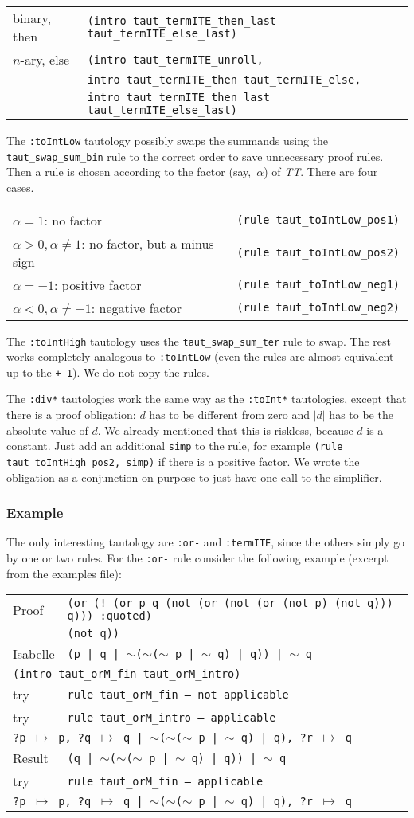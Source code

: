 \documentclass[10pt,a4paper]{article}
\newcommand{\ttt}{\texttt}
\newcommand{\negat}{\ensuremath{\sim}}
\newcommand{\nega}{\negat\xspace}
\newcommand{\pat}[2]{\ttt{?#1} $\mapsto$ \ttt{#2}}
\newcommand{\TTx}{\emph{TT}}
\newcommand{\TT}{\TTx\xspace}
\newenvironment{rt}{\begin{center}\begin{tabular}{|l l|}\hline}{\end{tabular}\end{center}}
\newcommand{\rl}[2]{\rm{#1} & \tt{#2} \\[1mm]}
\newcommand{\rll}[2]{\rm{#1} & \tt{#2} \\\hline}
\def\ind{\quad}
\newcommand{\exl}[2]{\exlm{#1}{\ttt{#2}}}
\newcommand{\exlm}[2]{#1 & #2 \\[1mm]}
\newcommand{\exmc}[2]{\multicolumn{2}{l}{\ttt{#1} #2} \\[1mm]}
\newcommand{\exmcf}[1]{\multicolumn{2}{l}{\ttt{#1}}}
\begin{document}
\begin{rt}
	\rl{binary, then}{(intro taut\_termITE\_then\_last taut\_termITE\_else\_last)}
	\rl{$n$-ary, else}{(intro taut\_termITE\_unroll,}
		\rl{}{\ind intro taut\_termITE\_then taut\_termITE\_else,}
		\rll{}{\ind intro taut\_termITE\_then\_last taut\_termITE\_else\_last)}
\end{rt}

\smallskip

The \ttt{:toIntLow} tautology possibly swaps the summands using the \ttt{taut\_swap\_sum\_bin} rule to the correct order to save unnecessary proof rules. Then a rule is chosen according to the factor (say,~$\alpha$) of \TT. There are four cases.
%
\begin{rt}
	\rl{$\alpha = 1$: no factor}{(rule taut\_toIntLow\_pos1)}
	\rl{$\alpha > 0, \alpha \neq 1$: no factor, but a minus sign}{(rule taut\_toIntLow\_pos2)}
	\rl{$\alpha = -1$: positive factor}{(rule taut\_toIntLow\_neg1)}
	\rll{$\alpha < 0, \alpha \neq -1$: negative factor}{(rule taut\_toIntLow\_neg2)}
\end{rt}

The \ttt{:toIntHigh} tautology uses the \ttt{taut\_swap\_sum\_ter} rule to swap. The rest works completely analogous to \ttt{:toIntLow} (even the rules are almost equivalent up to the \ttt{+ 1}). We do not copy the rules.

\smallskip

The \ttt{:div*} tautologies work the same way as the \ttt{:toInt*} tautologies, except that there is a proof obligation: $d$ has to be different from zero and $|d|$ has to be the absolute value of $d$. We already mentioned that this is riskless, because $d$ is a constant. Just add an additional \ttt{simp} to the rule, for example \ttt{(rule taut\_toIntHigh\_pos2, simp)} if there is a positive factor. We wrote the obligation as a conjunction on purpose to just have one call to the simplifier.
%
\subsubsection*{Example}
The only interesting tautology are \ttt{:or-} and \ttt{:termITE}, since the others simply go by one or two rules. For the \ttt{:or-} rule consider the following example (excerpt from the examples file):

\bigskip \noindent \begin{tabular}{ll}
	\exl{Proof}{(or (!~(or p q (not (or (not (or (not p) (not q))) q))) :quoted)}
		\exl{}{\ind (not q))}
	\exl{Isabelle}{(p | q | \nega (\nega (\nega p | \nega q) | q)) | \nega q}
	\exmc{(intro taut\_orM\_fin taut\_orM\_intro)}{}
	\exl{try}{rule taut\_orM\_fin \rm{-- not applicable}}
	\exl{try}{rule taut\_orM\_intro \rm{-- applicable}}
	\exmc{\ind \pat{p}{p}, \pat{q}{q | \nega (\nega (\nega p | \nega q) | q)}, \pat{r}{q}}{}
	\exl{Result}{(q | \nega (\nega (\nega p | \nega q) | q)) | \nega q}
	\exl{try}{rule taut\_orM\_fin \rm{-- applicable}}
	\exmcf{\ind \pat{p}{p}, \pat{q}{q | \nega (\nega (\nega p | \nega q) | q)}, \pat{r}{q}}{}
\end{tabular}
\end{document}
